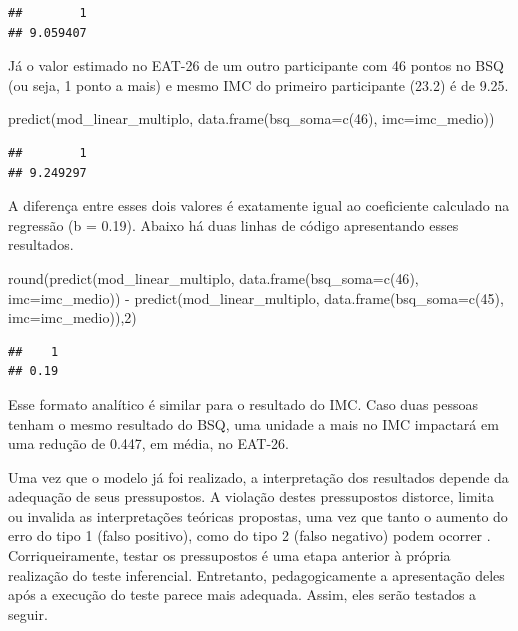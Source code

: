 \documentclass[
]{book}
\newenvironment{Shaded}{\begin{snugshade}}{\end{snugshade}}
\newcommand{\AttributeTok}[1]{\textcolor[rgb]{0.77,0.63,0.00}{#1}}
\newcommand{\DecValTok}[1]{\textcolor[rgb]{0.00,0.00,0.81}{#1}}
\newcommand{\FunctionTok}[1]{\textcolor[rgb]{0.00,0.00,0.00}{#1}}
\newcommand{\NormalTok}[1]{#1}
\newcommand{\SpecialCharTok}[1]{\textcolor[rgb]{0.00,0.00,0.00}{#1}}
\begin{document}
\begin{verbatim}
##        1 
## 9.059407
\end{verbatim}

Já o valor estimado no EAT-26 de um outro participante com 46 pontos no BSQ (ou seja, 1 ponto a mais) e mesmo IMC do primeiro participante (23.2) é de 9.25.

\begin{Shaded}
\begin{Highlighting}[]
\FunctionTok{predict}\NormalTok{(mod\_linear\_multiplo, }\FunctionTok{data.frame}\NormalTok{(}\AttributeTok{bsq\_soma=}\FunctionTok{c}\NormalTok{(}\DecValTok{46}\NormalTok{), }
                                        \AttributeTok{imc=}\NormalTok{imc\_medio))}
\end{Highlighting}
\end{Shaded}

\begin{verbatim}
##        1 
## 9.249297
\end{verbatim}

A diferença entre esses dois valores é exatamente igual ao coeficiente calculado na regressão (b = 0.19). Abaixo há duas linhas de código apresentando esses resultados.

\begin{Shaded}
\begin{Highlighting}[]
\FunctionTok{round}\NormalTok{(}\FunctionTok{predict}\NormalTok{(mod\_linear\_multiplo, }\FunctionTok{data.frame}\NormalTok{(}\AttributeTok{bsq\_soma=}\FunctionTok{c}\NormalTok{(}\DecValTok{46}\NormalTok{), }
                                              \AttributeTok{imc=}\NormalTok{imc\_medio)) }\SpecialCharTok{{-}} 
        \FunctionTok{predict}\NormalTok{(mod\_linear\_multiplo, }\FunctionTok{data.frame}\NormalTok{(}\AttributeTok{bsq\_soma=}\FunctionTok{c}\NormalTok{(}\DecValTok{45}\NormalTok{), }
                                                \AttributeTok{imc=}\NormalTok{imc\_medio)),}\DecValTok{2}\NormalTok{)}
\end{Highlighting}
\end{Shaded}

\begin{verbatim}
##    1 
## 0.19
\end{verbatim}

Esse formato analítico é similar para o resultado do IMC. Caso duas pessoas tenham o mesmo resultado do BSQ, uma unidade a mais no IMC impactará em uma redução de 0.447, em média, no EAT-26.

Uma vez que o modelo já foi realizado, a interpretação dos resultados depende da adequação de seus pressupostos. A violação destes pressupostos distorce, limita ou invalida as interpretações teóricas propostas, uma vez que tanto o aumento do erro do tipo 1 (falso positivo), como do tipo 2 (falso negativo) podem ocorrer \citep{Lix1996, Barker2015, Ernst2017}. Corriqueiramente, testar os pressupostos é uma etapa anterior à própria realização do teste inferencial. Entretanto, pedagogicamente a apresentação deles após a execução do teste parece mais adequada. Assim, eles serão testados a seguir.
\end{document}
